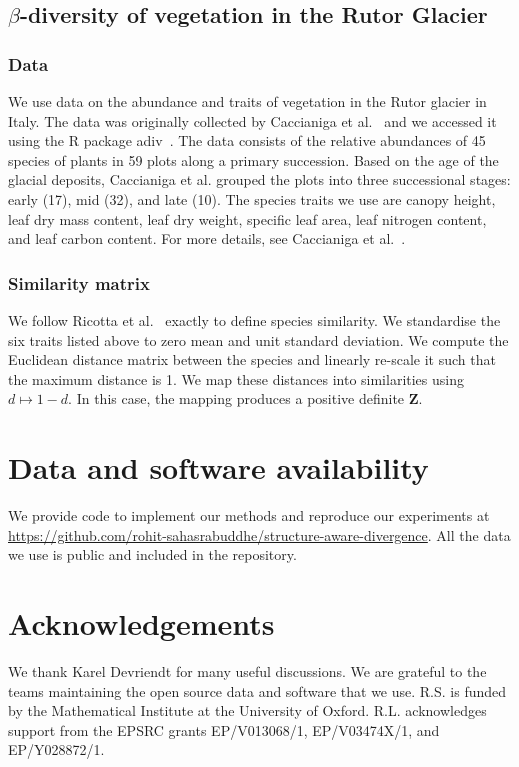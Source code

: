 \documentclass[aps,pre,floats,floatfix,superscriptaddress,twocolumn,final,10pt]{revtex4-2}
\theoremstyle{definition}
\renewcommand{\vec}[1]{\mathbf{#1}}
\begin{document}
\subsection{$\beta$-diversity of vegetation in the Rutor Glacier}
\subsubsection{Data}
We use data on the abundance and traits of vegetation in the Rutor glacier in Italy. The data was originally collected by Caccianiga et al.~\cite{Caccianiga2006} and we accessed it using the R package adiv~\cite{Pavoine2020}. The data consists of the relative abundances of 45 species of plants in 59 plots along a primary succession. Based on the age of the glacial deposits, Caccianiga et al. grouped the plots into three successional stages: early (17), mid (32), and late (10). The species traits we use are canopy height, leaf dry mass content, leaf dry weight, specific leaf area, leaf nitrogen content, and leaf carbon content. For more details, see Caccianiga et al.~\cite{Caccianiga2006}.

\subsubsection{Similarity matrix}
We follow Ricotta et al.~\cite{Ricotta2021} exactly to define species similarity. We standardise the six traits listed above to zero mean and unit standard deviation. We compute the Euclidean distance matrix between the species and linearly re-scale it such that the maximum distance is 1. We map these distances into similarities using $d\mapsto1-d$. In this case, the mapping produces a positive definite $\vec{Z}$.


\section*{Data and software availability} We provide code to implement our methods and reproduce our experiments at \url{https://github.com/rohit-sahasrabuddhe/structure-aware-divergence}. All the data we use is public and included in the repository.


\section*{Acknowledgements}
We thank Karel Devriendt for many useful discussions. We are grateful to the teams maintaining the open source data and software that we use. R.S. is funded by the Mathematical Institute at the University of Oxford. R.L. acknowledges support from the EPSRC grants EP/V013068/1, EP/V03474X/1, and EP/Y028872/1.
\end{document}
